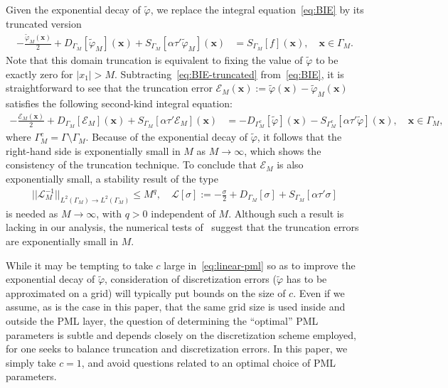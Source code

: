 \documentclass[review,hidelinks,onefignum,onetabnum]{siamart220329}
\newcommand{\bx}{\mathbf{x}}
\newcommand{\tvarphi}{\widetilde \varphi}
\begin{document}
Given the exponential decay of $\tvarphi$, we replace the integral equation~\cref{eq:BIE} by its truncated version
\begin{align}
  \label{eq:BIE-truncated}
  -\frac{\tvarphi_{M}(\bx)}{2} + D_{\Gamma_{M}}[\tvarphi_M](\bx) + S_{\Gamma_{M}}\left[\alpha\tau'\tvarphi_M\right](\bx) &= S_{\Gamma_M}[f](\bx), \quad \bx \in \Gamma_M.
\end{align}
Note that this domain truncation is equivalent to fixing the value of $\tvarphi$
to be exactly zero for $|x_1| > M$. Subtracting~\cref{eq:BIE-truncated} from~\cref{eq:BIE}, it is straightforward to see that the truncation error $\mathcal{E}_M(\bx) := \tvarphi(\bx) - \tvarphi_M(\bx)$
satisfies the following second-kind integral equation:
\begin{align}
  \label{eq:BIE-truncated-error}
  -\frac{\mathcal{E}_M(\bx)}{2} + D_{\Gamma_{M}}[\mathcal{E}_M](\bx) + S_{\Gamma_{M}}\left[\alpha \tau' \mathcal{E}_M\right](\bx) &= -D_{\Gamma^c_{M}}[\tvarphi](\bx) - S_{\Gamma^c_{M}}\left[\alpha \tau' \tvarphi\right](\bx), \quad \bx \in \Gamma_M,
\end{align}
where $\Gamma_M^c = \Gamma \setminus \Gamma_M$. Because of the exponential decay of $\tvarphi$, it follows that the right-hand side is exponentially small in $M$ as $M \to \infty$, which shows the consistency of the truncation technique.  To conclude that $\mathcal{E}_M$ is also exponentially small, a stability result of the type
\begin{align}
    || \mathcal{L}^{-1}_M ||_{L^2(\Gamma_M) \to L^2(\Gamma_M)} \leq M^q, \quad    \mathcal{L}[\sigma] := - \frac{\sigma}{2} + D_{\Gamma_M}[\sigma] + S_{\Gamma_{M}}[\alpha \tau' \sigma]
\end{align}
is needed as $M \to \infty$, with $q > 0$ independent of $M$. Although such a result is lacking in our analysis, the numerical tests of~ suggest that the truncation errors are exponentially small in $M$. 

\begin{remark}
While it may be tempting to take $c$ large in~\cref{eq:linear-pml} so as to improve the exponential decay of $\tvarphi$, consideration of discretization errors ($\tvarphi$ has to be approximated on a grid) will typically put bounds on the size of $c$. Even if we assume, as is the case in this paper, that the same grid size is used inside and outside the PML layer, the question of determining the ``optimal'' PML parameters is subtle and depends closely on the discretization scheme employed, for one seeks to balance truncation and discretization errors. In this paper, we simply take $c=1$, and avoid questions related to an optimal choice of PML parameters. 
\end{remark}
\end{document}
